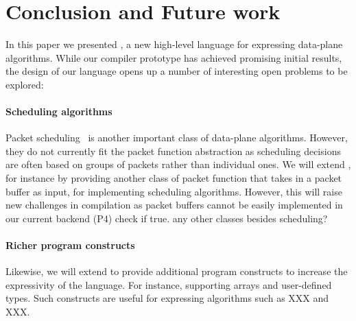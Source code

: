 \section{Conclusion and Future work}


%
%


\label{s:future}

In this paper we presented \pktlanguage, a new high-level language for expressing 
data-plane
algorithms. While our compiler prototype has achieved promising initial results, 
the design of our language opens up 
a number of interesting open problems to be explored:

\paragraph{Scheduling algorithms}
Packet scheduling~\cite{XXX, XXX} is another important class of data-plane algorithms.
However, they do not currently fit the \pktlanguage packet function abstraction
as scheduling decisions are often based on groups of packets rather than individual
ones. We will extend \pktlanguage, for instance by providing another class of packet
function that takes in a packet buffer as input, for implementing scheduling algorithms.
However, this will raise new challenges in compilation as packet buffers cannot be
easily implemented in our current backend (P4) \ac{check if true}.
\ac{any other classes besides scheduling?}

\paragraph{Richer program constructs}
Likewise, we will extend \pktlanguage to provide additional program constructs
to increase the expressivity of the language. For instance, supporting 
arrays and user-defined types. Such constructs are useful for expressing 
algorithms such as XXX and XXX.

